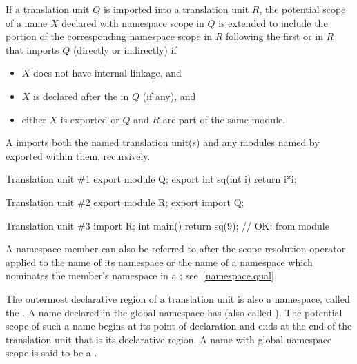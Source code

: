 \pnum
If a translation unit $Q$ is imported into a translation unit $R$,
the potential scope of a name $X$ declared with namespace scope in $Q$
is extended to include the portion of the corresponding namespace
scope in $R$ following the first 
or 
in $R$ that imports $Q$ (directly or indirectly) if
\begin{itemize}
\item $X$ does not have internal linkage, and
\item $X$ is declared after the  in $Q$ (if any), and
\item either $X$ is exported or $Q$ and $R$ are part of the same module.
\end{itemize}
\begin{note}
A  imports both
the named translation unit(s) and
any modules named by exported
 within them,
recursively.
\begin{example}
\begin{codeblocktu}{Translation unit \#1}
export module Q;
export int sq(int i) { return i*i; }
\end{codeblocktu}

\begin{codeblocktu}{Translation unit \#2}
export module R;
export import Q;
\end{codeblocktu}

\begin{codeblocktu}{Translation unit \#3}
import R;
int main() { return sq(9); }   // OK:  from module 
\end{codeblocktu}
\end{example}
\end{note}

\pnum
A namespace member can also be referred to after the \tcode{::} scope
resolution operator applied to the name of its
namespace or the name of a namespace which nominates the member's
namespace in a ; see~\ref{namespace.qual}.

\pnum
The outermost declarative region of a translation unit is also a
namespace, called the . A name declared in
the global namespace has  (also called
). The potential scope of such a name begins at
its point of declaration and ends at the end
of the translation unit that is its declarative region.
A name with global namespace scope is said to be a
.

